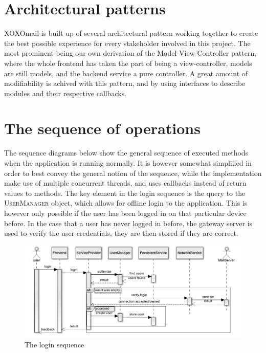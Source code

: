 \section{Architectural patterns}
	XOXOmail is built up of several architectural pattern working together to create the best possible experience for every stakeholder involved in this project. The most prominent being our own derivation of the Model-View-Controller pattern, where the whole frontend has taken the part of being a view-controller, models are still models, and the backend service a pure controller. A great amount of modifiability is achived with this pattern, and by using interfaces to describe modules and their respective callbacks. 
	
\section{The sequence of operations}
	The sequence diagrams below show the general sequence of executed methods when the application is running normally. It is however somewhat simplified in order to best convey the general notion of the sequence, while the implementation make use of multiple concurrent threads, and uses callbacks instead of return values to methods. 
	The key element in the login sequence is the query to the \textsc{UserManager} object, which allows for offline login to the application. This is however only possible if the user has been logged in on that particular device before. In the case that a user has never logged in before, the gateway server is used to verify the user credentials, they are then stored if they are correct. 
	\begin{figure}[H]
		\includegraphics[width=\textwidth]{LoginSequence}
		\caption{The login sequence}
		\label{fig:lifecycle}
	\end{figure}
	
